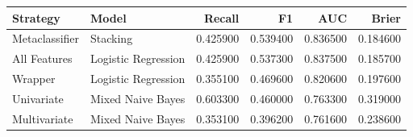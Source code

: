 \begin{tabular}{llrrrr}
\toprule
Strategy & Model & Recall & F1 & AUC & Brier \\
\midrule
Metaclassifier & Stacking & 0.425900 & 0.539400 & 0.836500 & 0.184600 \\
All Features & Logistic Regression & 0.425900 & 0.537300 & 0.837500 & 0.185700 \\
Wrapper & Logistic Regression & 0.355100 & 0.469600 & 0.820600 & 0.197600 \\
Univariate & Mixed Naive Bayes & 0.603300 & 0.460000 & 0.763300 & 0.319000 \\
Multivariate & Mixed Naive Bayes & 0.353100 & 0.396200 & 0.761600 & 0.238600 \\
\bottomrule
\end{tabular}
